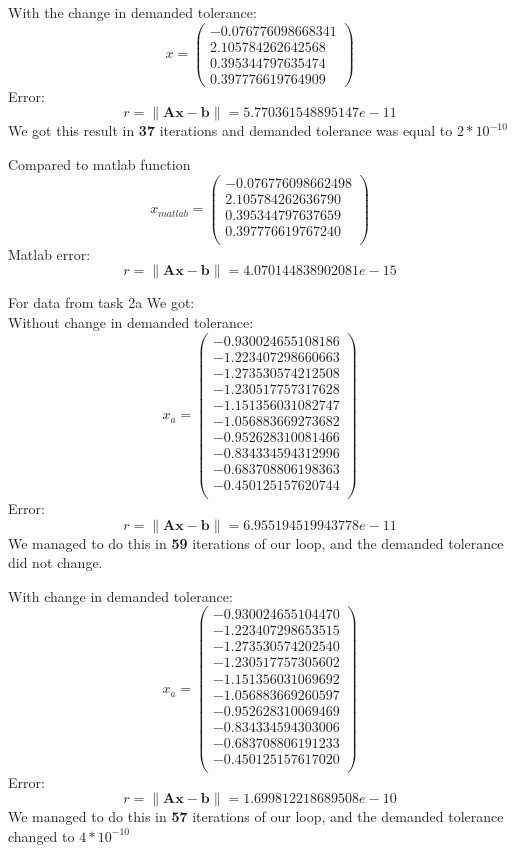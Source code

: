 \documentclass[12pt]{report}
\begin{document}
With the change in demanded tolerance:
\[ x = \left( \begin{array}{cc}
  -0.076776098668341 \\
   2.105784262642568 \\
   0.395344797635474 \\
   0.397776619764909
\end{array} \right)
\]
Error:
\[ r = \| \mathbf{A}\mathbf{x} - \mathbf{b}\| = 5.770361548895147e-11 \]
We got this result in \textbf{37} iterations and demanded tolerance was equal to $2*10^{-10}$

Compared to matlab function
\[ x_{matlab} = \left( \begin{array}{cc}
  -0.076776098662498 \\
   2.105784262636790 \\
   0.395344797637659 \\
   0.397776619767240 \\
\end{array} \right)
\]
Matlab error:
\[ r = \| \mathbf{A}\mathbf{x} - \mathbf{b}\| = 4.070144838902081e-15 \]

For data from task 2a We got: \\
Without change in demanded tolerance:
\[ x_a = \left( \begin{array}{cc}
-0.930024655108186 \\
-1.223407298660663 \\
-1.273530574212508 \\
-1.230517757317628 \\
-1.151356031082747 \\
-1.056883669273682 \\
-0.952628310081466 \\
-0.834334594312996 \\
-0.683708806198363 \\
-0.450125157620744 \\
\end{array} \right)
\]
Error:
\[ r = \| \mathbf{A}\mathbf{x} - \mathbf{b}\| = 6.955194519943778e-11 \]
We managed to do this in \textbf{59} iterations of our loop, and the demanded tolerance did not change.

With change in demanded tolerance:
\[ x_a = \left( \begin{array}{cc}
-0.930024655104470 \\
-1.223407298653515 \\
-1.273530574202540 \\
-1.230517757305602 \\
-1.151356031069692 \\
-1.056883669260597 \\
-0.952628310069469 \\
-0.834334594303006 \\
-0.683708806191233 \\
-0.450125157617020 \\
\end{array} \right)
\]
Error:
\[ r = \| \mathbf{A}\mathbf{x} - \mathbf{b}\| = 1.699812218689508e-10 \]
We managed to do this in \textbf{57} iterations of our loop, and the demanded tolerance changed to $4*10^{-10}$
\end{document}
